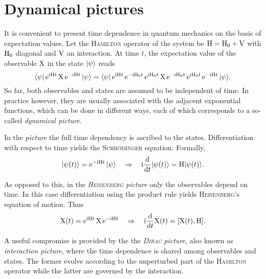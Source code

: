 \section{Dynamical pictures}

It is convenient to present time dependence in quantum mechanics on the basis of
expectation values. Let the \textsc{Hamilton} operator of the system be $\mathrm H =
\mathrm H_0 + \mathrm V$ with $\mathrm H_0$ diagonal and $\mathrm V$ an interaction. At time
$t$, the expectation value of the observable $\mathrm X$ in the state $|\psi\rangle$
reads
%
\begin{equation*}
    \langle\psi| \, \mathrm e^{\mathrm i \mathrm H t} \, \mathrm X \, \mathrm e^{-\mathrm i \mathrm H t} \, |\psi\rangle =
    \langle\psi| \, \mathrm e^{\mathrm i \mathrm H t} \, \mathrm e^{-\mathrm i \mathrm H_0 t} \,
    \mathrm e^{\mathrm i \mathrm H_0 t} \, \mathrm X \, \mathrm e^{-\mathrm i \mathrm H_0 t} \,
    \mathrm e^{\mathrm i \mathrm H_0 t} \, \mathrm e^{-\mathrm i \mathrm H t} \, |\psi\rangle.
\end{equation*}
%
So far, both observables and states are assumed to be independent of time. In
practice however, they are usually associated with the adjacent exponential
functions, which can be done in different ways, each of which corresponds to a
so-called \emph{dynamical picture}.

In the \emph{ picture} the full time dependency is ascribed to
the states. Differentiation with respect to time yields the \textsc{Schrödinger}
equation. Formally,
%
\begin{equation*}
    |\psi(t)\rangle = \mathrm e^{-\mathrm i \mathrm H t} \, |\psi\rangle
    \quad \Rightarrow \quad
    \mathrm i \frac {\mathrm d} {\mathrm d t} |\psi(t)\rangle = \mathrm H |\psi(t)\rangle.
\end{equation*}

As opposed to this, in the \emph{\textsc{Heisenberg} picture} only the
observables depend on time. In this case differentiation using the product rule
yields \textsc{Heisenberg}'s equation of motion. Thus
%
\begin{equation*}
    \mathrm X(t) = \mathrm e^{\mathrm i \mathrm H t} \, \mathrm X \, \mathrm e^{-\mathrm i \mathrm H t}
    \quad \Rightarrow \quad
    \mathrm i \frac {\mathrm d} {\mathrm d t} \mathrm X(t) = [\mathrm X(t), \mathrm H].
\end{equation*}

A useful compromise is provided by the the \emph{\textsc{Dirac} picture}, also
known as \emph{interaction picture}, where the time dependence is shared among
observables and states. The former evolve according to the unperturbed part of
the \textsc{Hamilton} operator while the latter are governed by the interaction.

